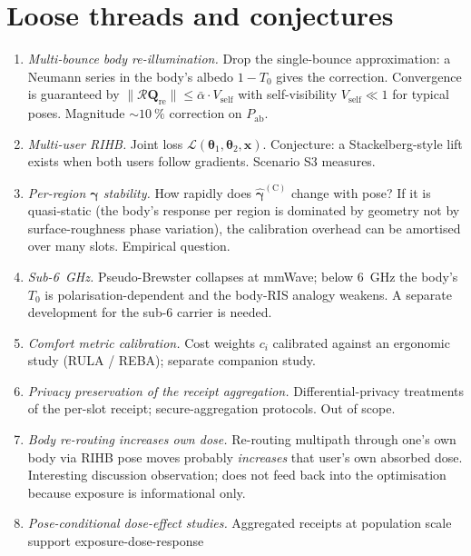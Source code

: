 \documentclass[11pt,a4paper]{article}
\theoremstyle{definition}
\newcommand{\xvec}{\mathbf{x}}
\newcommand{\thetab}{\bm{\theta}}
\newcommand{\Pabs}{P_{\mathrm{ab}}}
\newcommand{\Qref}{\mathbf{Q}_{\mathrm{re}}}
\begin{document}
\section{Loose threads and conjectures}\label{sec:threads}

\begin{enumerate}[leftmargin=1.6em,itemsep=3pt]
\item \emph{Multi-bounce body re-illumination.}  Drop the
single-bounce approximation: a Neumann series in the body's
albedo $1-T_0$ gives the correction.  Convergence is guaranteed by
$\|\mathcal{R}\Qref\|\le\bar\alpha\cdot V_{\mathrm{self}}$ with
self-visibility $V_{\mathrm{self}}\ll 1$ for typical poses.
Magnitude $\sim\SI{10}{\percent}$ correction on $\Pabs$.
\item \emph{Multi-user RIHB.}  Joint loss
$\mathcal{L}(\thetab_1,\thetab_2,\xvec)$.  Conjecture: a
Stackelberg-style lift exists when both users follow gradients.
Scenario S3 measures.
\item \emph{Per-region $\bm\gamma$ stability.}  How rapidly does
$\hat{\bm\gamma}^{(\mathrm{C})}$ change with pose?  If it is
quasi-static (the body's response per region is dominated by
geometry not by surface-roughness phase variation), the calibration
overhead can be amortised over many slots.  Empirical question.
\item \emph{Sub-\SI{6}{\GHz}.}  Pseudo-Brewster collapses at
mmWave; below \SI{6}{GHz} the body's $T_0$ is polarisation-dependent
and the body-RIS analogy weakens.  A separate development for the
sub-6 carrier is needed.
\item \emph{Comfort metric calibration.}  Cost weights $c_i$
calibrated against an ergonomic study (RULA / REBA); separate
companion study.
\item \emph{Privacy preservation of the receipt aggregation.}
Differential-privacy treatments of the per-slot receipt;
secure-aggregation protocols.  Out of scope.
\item \emph{Body re-routing increases own dose.}  Re-routing
multipath through one's own body via RIHB pose moves probably
\emph{increases} that user's own absorbed dose.  Interesting
discussion observation; does not feed back into the optimisation
because exposure is informational only.
\item \emph{Pose-conditional dose-effect studies.}  Aggregated
receipts at population scale support exposure-dose-response

\end{enumerate}
\end{document}
